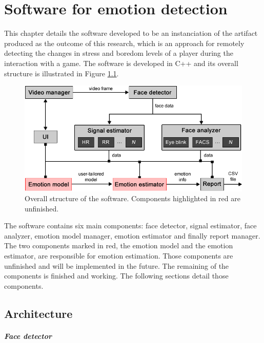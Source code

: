 \chapter{Software for emotion detection}
\label{ch:software}

This chapter details the software developed to be an instanciation of the artifact produced as the outcome of this research, which is an approach for remotely detecting the changes in stress and boredom levels of a player during the interaction with a game. The software is developed in C++ and its overall structure is illustrated in Figure \ref{fig:tool-overall-structure}.

\begin{figure}[h]
    \centering
    \includegraphics[width=\textwidth]{figures/tool-overall-structure.png}
    \caption{Overall structure of the software. Components highlighted in red are unfinished.}
    \label{fig:tool-overall-structure}
\end{figure}

The software contains six main components: face detector, signal estimator, face analyzer, emotion model manager, emotion estimator and finally report manager. The two components marked in red, the emotion model and the emotion estimator, are responsible for emotion estimation. Those components are unfinished and will be implemented in the future. The remaining of the components is finished and working. The following sections detail those components.

\section{Architecture}

\paragraph{Face detector}


